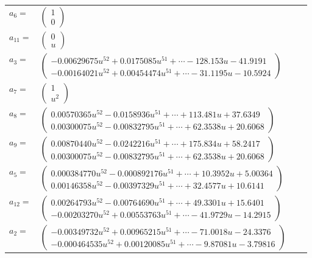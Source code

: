 \documentclass[1p]{elsarticle_modified}
\theoremstyle{definition}
\begin{document}
\begin{tabular}{m{7pt} m{180pt} m{7pt} m{180pt} }
\flushright $a_{6}=$&$\begin{pmatrix}1\\0\end{pmatrix}$ \\
\flushright $a_{11}=$&$\begin{pmatrix}0\\u\end{pmatrix}$ \\
\flushright $a_{3}=$&$\begin{pmatrix}-0.00629675 u^{52}+0.0175085 u^{51}+\cdots-128.153 u-41.9191\\-0.00164021 u^{52}+0.00454474 u^{51}+\cdots-31.1195 u-10.5924\end{pmatrix}$ \\
\flushright $a_{7}=$&$\begin{pmatrix}1\\u^2\end{pmatrix}$ \\
\flushright $a_{8}=$&$\begin{pmatrix}0.00570365 u^{52}-0.0158936 u^{51}+\cdots+113.481 u+37.6349\\0.00300075 u^{52}-0.00832795 u^{51}+\cdots+62.3538 u+20.6068\end{pmatrix}$ \\
\flushright $a_{9}=$&$\begin{pmatrix}0.00870440 u^{52}-0.0242216 u^{51}+\cdots+175.834 u+58.2417\\0.00300075 u^{52}-0.00832795 u^{51}+\cdots+62.3538 u+20.6068\end{pmatrix}$ \\
\flushright $a_{5}=$&$\begin{pmatrix}0.000384770 u^{52}-0.000892176 u^{51}+\cdots+10.3952 u+5.00364\\0.00146358 u^{52}-0.00397329 u^{51}+\cdots+32.4577 u+10.6141\end{pmatrix}$ \\
\flushright $a_{12}=$&$\begin{pmatrix}0.00264793 u^{52}-0.00764690 u^{51}+\cdots+49.3301 u+15.6401\\-0.00203270 u^{52}+0.00553763 u^{51}+\cdots-41.9729 u-14.2915\end{pmatrix}$ \\
\flushright $a_{2}=$&$\begin{pmatrix}-0.00349732 u^{52}+0.00965215 u^{51}+\cdots-71.0018 u-24.3376\\-0.000464535 u^{52}+0.00120085 u^{51}+\cdots-9.87081 u-3.79816\end{pmatrix}$ \\

\end{tabular}
\end{document}

